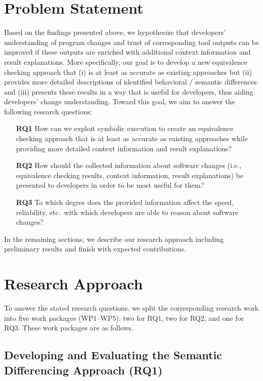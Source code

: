 \section{Problem Statement}

Based on the findings presented above, we hypothesize that developers' understanding of program changes and trust of corresponding tool outputs can be improved if these outputs are enriched with additional context information and result explanations. 
%
More specifically, our goal is to develop a new equivalence checking approach that (i) is at least as accurate as existing approaches but (ii) provides more detailed descriptions of identified behavioral / semantic differences and (iii) presents these results in a way that is useful for developers, thus aiding developers' change understanding.
%
Toward this goal, we aim to answer the following research questions:

\begin{itemize}
    \item[\textbf{RQ1}] How can we exploit symbolic execution to create an equivalence checking approach that is at least as accurate as existing approaches while providing more detailed context information and result explanations?
    \item[\textbf{RQ2}] How should the collected information about software changes (i.e., equivalence checking results, context information, result explanations) be presented to developers in order to be most useful for them?
    \item[\textbf{RQ3}] To which degree does the provided information affect the speed, reliability, etc.\ with which developers are able to reason about software changes?
\end{itemize}

In the remaining sections, we describe our research approach including preliminary results and finish with expected contributions.

\section{Research Approach}

To answer the stated research questions, we split the corresponding research work into five work packages (WP1--WP5): two for RQ1, two for RQ2, and one for RQ3. These work packages are as follows.

\subsection{Developing and Evaluating the Semantic Differencing Approach (RQ1)}

